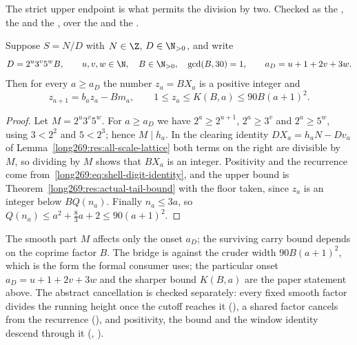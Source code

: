 \noindent The strict upper endpoint is what permits the division by two.
Checked as the
, the
 and the
,
over the
 and the
.

\begin{theorem}
\label{long269:res:actual-cancellation}\label{long269:res:lead-carry-bridge}
\label{long269:res:actual-carry-bound}\label{long269:res:denominator-reduction}
Suppose $S=N/D$ with $N\in\Z$, $D\in\N_{>0}$, and write
\[
 D=2^{u}3^{v}5^{w}B,\qquad u,v,w\in\N,\quad B\in\N_{>0},\quad\gcd(B,30)=1,
 \qquad a_D=u+1+2v+3w .
\]
Then for every $a\ge a_D$ the number $z_a=BX_a$ is a positive integer and
\[
 z_{a+1}=b_az_a-Bm_a,\qquad 1\le z_a\le K(B,a)\le90B(a+1)^{2} .
\]
\end{theorem}

\begin{proof}
Let $M=2^{u}3^{v}5^{w}$.  For $a\ge a_D$ we have $2^{a}\ge2^{u+1}$,
$2^{a}\ge3^{v}$ and $2^{a}\ge5^{w}$, using $3<2^{2}$ and $5<2^{3}$; hence
$M\mid h_a$.  In the clearing identity $DX_a=h_aN-Dv_a$ of
Lemma~\ref{long269:res:all-scale-lattice} both terms on the right are divisible by $M$,
so dividing by $M$ shows that $BX_a$ is an integer.  Positivity and the
recurrence come from~\eqref{long269:eq:shell-digit-identity}, and the upper bound is
Theorem~\ref{long269:res:actual-tail-bound} with the floor taken, since $z_a$ is an
integer below $BQ(n_a)$.  Finally $n_a\le3a$, so
$Q(n_a)\le a^{2}+\tfrac83a+2\le90(a+1)^{2}$.
\end{proof}

\noindent The smooth part $M$ affects only the onset $a_D$; the surviving carry
bound depends on the coprime factor $B$.  The bridge is
against the cruder width $90B(a+1)^{2}$, which is the form the formal consumer
uses; the particular onset $a_D=u+1+2v+3w$ and the sharper bound
$K(B,a)$ are the paper statement above.  The abstract cancellation is checked
separately: every fixed smooth factor divides the running height once the
cutoff reaches it
(),
a shared factor cancels from the recurrence
(),
and positivity, the bound and the window identity descend through it
(,
).


